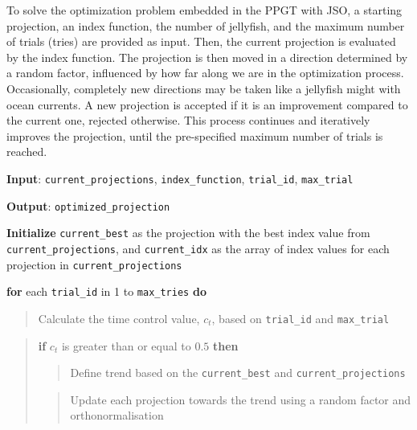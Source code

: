 \documentclass[
  12pt,
]{interact}
\theoremstyle{plain}
\begin{document}
To solve the optimization problem embedded in the PPGT with JSO, a
starting projection, an index function, the number of jellyfish, and the
maximum number of trials (tries) are provided as input. Then, the
current projection is evaluated by the index function. The projection is
then moved in a direction determined by a random factor, influenced by
how far along we are in the optimization process. Occasionally,
completely new directions may be taken like a jellyfish might with ocean
currents. A new projection is accepted if it is an improvement compared
to the current one, rejected otherwise. This process continues and
iteratively improves the projection, until the pre-specified maximum
number of trials is reached.

\begin{tcolorbox}[enhanced jigsaw, bottomrule=.15mm, leftrule=.75mm, breakable, coltitle=black, colback=white, colbacktitle=quarto-callout-note-color!10!white, arc=.35mm, colframe=quarto-callout-note-color-frame, toptitle=1mm, opacitybacktitle=0.6, opacityback=0, left=2mm, bottomtitle=1mm, rightrule=.15mm, toprule=.15mm, title={Algorithm: Jellyfish Optimizer Pseudo Code}, titlerule=0mm]

\textbf{Input}: \texttt{current\_projections}, \texttt{index\_function},
\texttt{trial\_id}, \texttt{max\_trial}

\textbf{Output}: \texttt{optimized\_projection}

\textbf{Initialize} \texttt{current\_best} as the projection with the
best index value from \texttt{current\_projections}, and
\texttt{current\_idx} as the array of index values for each projection
in \texttt{current\_projections}

\textbf{for} each \texttt{trial\_id} in 1 to \texttt{max\_tries}
\textbf{do}

\begin{quote}
Calculate the time control value, \(c_t\), based on \texttt{trial\_id}
and \texttt{max\_trial}
\end{quote}

\begin{quote}
\textbf{if} \(c_t\) is greater than or equal to \(0.5\) \textbf{then}

\begin{quote}
Define trend based on the \texttt{current\_best} and
\texttt{current\_projections}
\end{quote}

\begin{quote}
Update each projection towards the trend using a random factor and
orthonormalisation
\end{quote}


\end{quote}
\end{tcolorbox}
\end{document}

